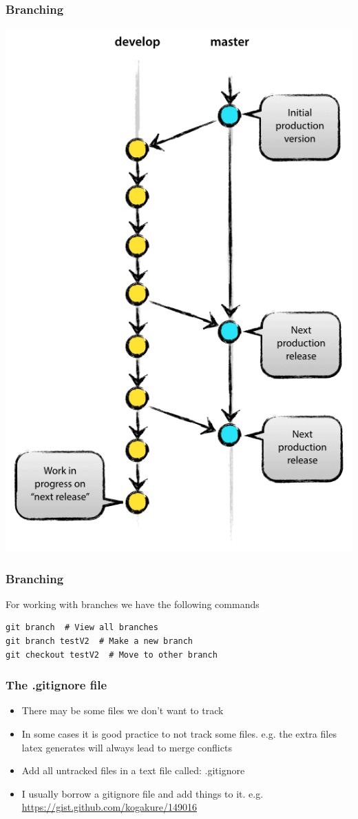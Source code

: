 \documentclass{beamer}
\begin{document}
\begin{frame}
\frametitle{Branching}
\centering
\includegraphics[scale = 0.25]{branching}
\end{frame}

\begin{frame}[fragile]
\frametitle{Branching}

For working with branches we have the following commands
\begin{verbatim}
git branch  # View all branches
git branch testV2  # Make a new branch
git checkout testV2  # Move to other branch 
\end{verbatim}

\end{frame}


\begin{frame}
\frametitle{The .gitignore file}
\begin{itemize}
\item There may be some files we don't want to track
\item In some cases it is good practice to not track some files. e.g. the extra files latex generates will always lead to merge conflicts
\item Add all untracked files in a text file called: .gitignore
\item I usually borrow a gitignore file and add things to it. e.g. 
\url{https://gist.github.com/kogakure/149016}
\end{itemize}
\end{frame}
\end{document}
